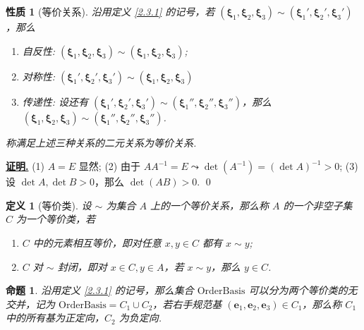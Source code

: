 \documentclass[10pt,openany]{article}
\theoremstyle{thmstyle} %
\theoremstyle{defstyle} %
\newtheorem{definition}[theorem]{定义}
\theoremstyle{prostyle} %
\newtheorem{proposition}[theorem]{命题}
\newtheorem{property}[theorem]{性质}
\theoremstyle{exastyle}
\theoremstyle{remstyle}
\renewenvironment{proof}[1][证明]{\par\underline{\textbf{#1.}} \;\fangsong}{\qed\par}
\newcommand{\bmxi}{\bm{\xi}}
\begin{document}
\begin{property}[等价关系] \label{2.3.2}
	沿用定义 \ref{2.3.1} 的记号，若 \( (\bmxi_1,\bmxi_2,\bmxi_3) \sim (\bmxi_1',\bmxi_2',\bmxi_3') \)，那么
	\begin{enumerate}[(1)]
		\item 自反性: \( (\bmxi_1,\bmxi_2,\bmxi_3) \sim (\bmxi_1,\bmxi_2,\bmxi_3) \);
		\item 对称性: \( (\bmxi_1',\bmxi_2',\bmxi_3') \sim (\bmxi_1,\bmxi_2,\bmxi_3) \)
		\item 传递性: 设还有 \( (\bmxi_1',\bmxi_2',\bmxi_3')  \sim (\bmxi_1'',\bmxi_2'',\bmxi_3'')  \)，那么 \( (\bmxi_1,\bmxi_2,\bmxi_3) \sim (\bmxi_1'',\bmxi_2'',\bmxi_3'') \).
	\end{enumerate}
	
	称满足上述三种关系的二元关系为等价关系.
\end{property}

\begin{proof}
	(1) \( A=E \) 显然; (2) 由于 \( AA^{-1}=E \leadsto \det(A^{-1})=(\det A)^{-1}>0 \); (3) 设 \( \det A,\det B>0 \)，那么 \( \det (AB)>0 \).
\end{proof}

\begin{definition}[等价类]
	设 \( \sim \) 为集合 \( A \) 上的一个等价关系，那么称 \( A \) 的一个非空子集 \( C \) 为一个等价类，若
	\begin{enumerate}[(1)]
		\item \( C \) 中的元素相互等价，即对任意 \( x,y \in C \) 都有 \( x \sim y \);
		\item \( C \) 对 \( \sim \) 封闭，即对 \( x \in C, y \in A \)，若 \( x \sim y \)，那么 \( y \in C  \).
	\end{enumerate}
\end{definition}

\begin{proposition}
	沿用定义 \ref{2.3.1} 的记号，那么集合 \( \text{OrderBasis} \) 可以分为两个等价类的无交并，记为 \( \text{OrderBasis}= C_1 \cup C_2 \)，若右手规范基 \( (\bm{e}_1,\bm{e}_2,\bm{e}_3) \in C_1 \)，那么称 \( C_1 \) 中的所有基为正定向，\( C_2 \) 为负定向.
\end{proposition}
\end{document}
